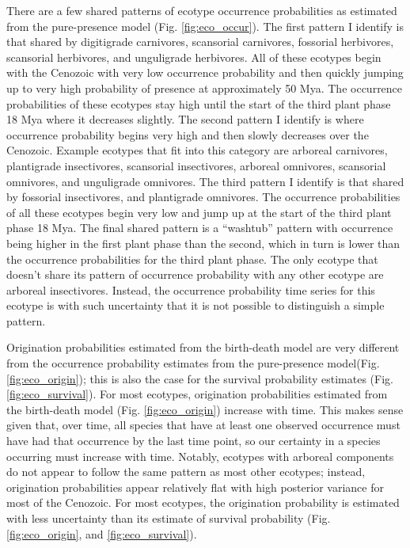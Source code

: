 \documentclass[12pt,letterpaper]{article}
\begin{document}
There are a few shared patterns of ecotype occurrence probabilities as estimated from the pure-presence model (Fig. \ref{fig:eco_occur}). The first pattern I identify is that shared by digitigrade carnivores, scansorial carnivores, fossorial herbivores, scansorial herbivores, and unguligrade herbivores. All of these ecotypes begin with the Cenozoic with very low occurrence probability and then quickly jumping up to very high probability of presence at approximately 50 Mya. The occurrence probabilities of these ecotypes stay high until the start of the third plant phase 18 Mya where it decreases slightly. The second pattern I identify is where occurrence probability begins very high and then slowly decreases over the Cenozoic. Example ecotypes that fit into this category are arboreal carnivores, plantigrade insectivores, scansorial insectivores, arboreal omnivores, scansorial omnivores, and unguligrade omnivores. The third pattern I identify is that shared by fossorial insectivores, and plantigrade omnivores. The occurrence probabilities of all these ecotypes begin very low and jump up at the start of the third plant phase 18 Mya. The final shared pattern is a ``washtub'' pattern with occurrence being higher in the first plant phase than the second, which in turn is lower than the occurrence probabilities for the third plant phase. The only ecotype that doesn't share its pattern of occurrence probability with any other ecotype are arboreal insectivores. Instead, the occurrence probability time series for this ecotype is with such uncertainty that it is not possible to distinguish a simple pattern. 

Origination probabilities estimated from the birth-death model are very different from the occurrence probability estimates from the pure-presence model(Fig. \ref{fig:eco_origin}); this is also the case for the survival probability estimates (Fig. \ref{fig:eco_survival}). 
For most ecotypes, origination probabilities estimated from the birth-death model (Fig. \ref{fig:eco_origin}) increase with time. This makes sense given that, over time, all species that have at least one observed occurrence must have had that occurrence by the last time point, so our certainty in a species occurring must increase with time. Notably, ecotypes with arboreal components do not appear to follow the same pattern as most other ecotypes; instead, origination probabilities appear relatively flat with high posterior variance for most of the Cenozoic. For most ecotypes, the origination probability is estimated with less uncertainty than its estimate of survival probability (Fig. \ref{fig:eco_origin}, and \ref{fig:eco_survival}). 
\end{document}
